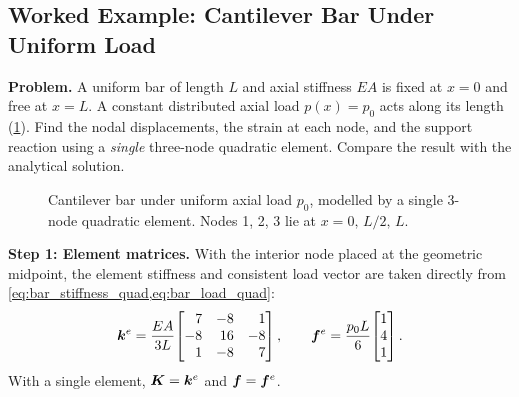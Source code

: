 \subsection{Worked Example: Cantilever Bar Under Uniform Load}
\label{sec:ex_bar_quad}

\begin{example}
\label{ex:bar_quad}

\noindent\textbf{Problem.}
A uniform bar of length $L$ and axial stiffness $EA$ is fixed at $x=0$
and free at $x=L$. A constant distributed axial load $p(x) = p_0$ acts
along its length (\cref{fig:ex_bar_quad}). Find the nodal displacements,
the strain at each node, and the support reaction using a \emph{single}
three-node quadratic element. Compare the result with the analytical
solution.

\begin{figure}[htbp]
\centering
{}
\caption{Cantilever bar under uniform axial load $p_0$, modelled by a
single 3-node quadratic element. Nodes 1, 2, 3 lie at
$x = 0,\,L/2,\,L$.}
\label{fig:ex_bar_quad}
\end{figure}

\medskip
\noindent\textbf{Step 1: Element matrices.}
With the interior node placed at the geometric midpoint, the element
stiffness and consistent load vector are taken directly from
\cref{eq:bar_stiffness_quad,eq:bar_load_quad}:
\[
    \matr{k}^e = \frac{EA}{3L}\!
    \begin{bmatrix*}[r]
         7 & -8 &  1 \\
        -8 & 16 & -8 \\
         1 & -8 &  7
    \end{bmatrix*},
    \qquad
    \vect{f}^e = \frac{p_0 L}{6}\!\begin{bmatrix} 1 \\ 4 \\ 1 \end{bmatrix} .
\]
With a single element, $\bm{K} = \bm{k}^e$ and $\bm{f} = \bm{f}^e$.


\end{example}
